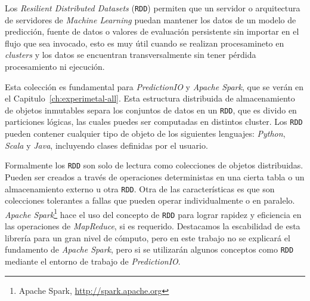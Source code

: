 Los \emph{Resilient Distributed Datasets} (\texttt{RDD}) permiten que un servidor o arquitectura de servidores de \emph{Machine Learning} puedan mantener los datos de un modelo de predicción, fuente de datos o valores de evaluación persistente sin importar en el flujo que sea invocado, esto es muy útil cuando se realizan procesamineto en \emph{clusters} y los datos se encuentran transversalmente sin tener pérdida procesamiento ni ejecución.

Esta colección es fundamental para \emph{PredictionIO} y \emph{Apache Spark}, que se verán en el Capitulo~\ref{ch:experimetal-all}. Esta estructura distribuida de almacenamiento de objetos inmutables separa los conjuntos de datos en un \texttt{RDD}\cite{zaharia2010}, que  es divido en particiones lógicas, las cuales puedes ser computadas en distintos cluster. Los \texttt{RDD} pueden contener cualquier tipo de objeto de los siguientes lenguajes: \emph{Python}, \emph{Scala} y \emph{Java}, incluyendo clases definidas por el usuario. 

Formalmente los \texttt{RDD} son solo de lectura como colecciones de objetos distribuidas. Pueden ser creados a través de  operaciones deterministas en una cierta tabla o un almacenamiento externo u otra \texttt{RDD}.
Otra de las características es que son colecciones tolerantes a fallas que pueden operar individualmente o en paralelo.
\emph{Apache Spark}\footnote{Apache Spark, \url{http://spark.apache.org}} hace el uso del concepto de \texttt{RDD} para lograr rapidez y eficiencia en las operaciones de \emph{MapReduce}, si es requerido. Destacamos la escabilidad de esta librería para un gran nivel de cómputo, pero en este trabajo no se explicará el fundamento de \emph{Apache Spark}, pero si se utilizarán algunos conceptos como \texttt{RDD} mediante el entorno de trabajo de \emph{PredictionIO}.
